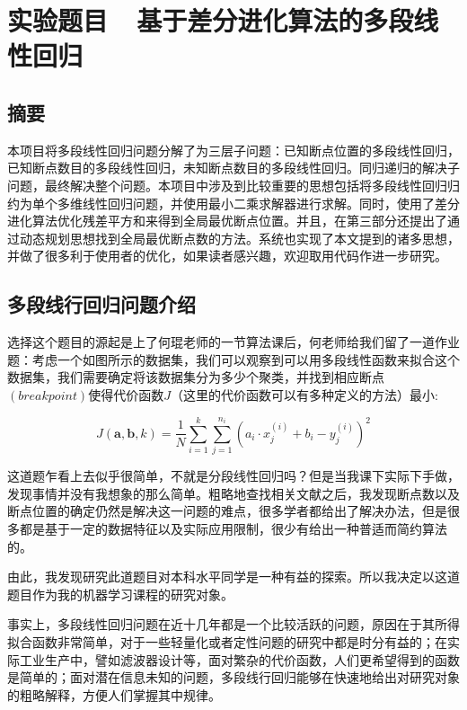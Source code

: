 \setlength{\headheight}{12.64723pt}
\addtolength{\topmargin}{-0.64723pt}
\section{实验题目\ \ 基于差分进化算法的多段线性回归}
\subsection{摘要}

本项目将多段线性回归问题分解了为三层子问题：已知断点位置的多段线性回归，已知断点数目的多段线性回归，未知断点数目的多段线性回归。同归递归的解决子问题，最终解决整个问题。本项目中涉及到比较重要的思想包括将多段线性回归归约为单个多维线性回归问题，并使用最小二乘求解器进行求解。同时，使用了差分进化算法优化残差平方和来得到全局最优断点位置。并且，在第三部分还提出了通过动态规划思想找到全局最优断点数的方法。系统也实现了本文提到的诸多思想，并做了很多利于使用者的优化，如果读者感兴趣，欢迎取用代码作进一步研究。


\subsection{多段线行回归问题介绍}

选择这个题目的源起是上了何琨老师的一节算法课后，何老师给我们留了一道作业题：考虑一个如图所示的数据集，我们可以观察到可以用多段线性函数来拟合这个数据集，我们需要确定将该数据集分为多少个聚类，并找到相应断点$(breakpoint)$使得代价函数$J$（这里的代价函数可以有多种定义的方法）最小:

\[J(\bm{a}, \bm{b}, k) = \frac{1}{N}\sum\limits_{i=1}^k \sum\limits_{j=1}^{n_i}(a_i\cdot x_j^{(i)}+b_i - y_j^{(i)})^2\]

这道题乍看上去似乎很简单，不就是分段线性回归吗？但是当我课下实际下手做，发现事情并没有我想象的那么简单。粗略地查找相关文献之后，我发现断点数以及断点位置的确定仍然是解决这一问题的难点，很多学者都给出了解决办法，但是很多都是基于一定的数据特征以及实际应用限制，很少有给出一种普适而简约算法的。

由此，我发现研究此道题目对本科水平同学是一种有益的探索。所以我决定以这道题目作为我的机器学习课程的研究对象。

事实上，多段线性回归问题在近十几年都是一个比较活跃的问题，原因在于其所得拟合函数非常简单，对于一些轻量化或者定性问题的研究中都是时分有益的；在实际工业生产中，譬如滤波器设计等，面对繁杂的代价函数，人们更希望得到的函数是简单的；面对潜在信息未知的问题，多段线行回归能够在快速地给出对研究对象的粗略解释，方便人们掌握其中规律。


